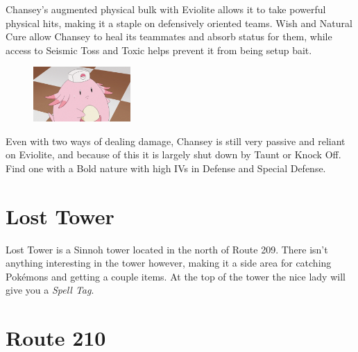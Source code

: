 \documentclass[11pt]{article}
\begin{document}


% 


\begin{mdframed}[style=MyFrame,nobreak=true,frametitle={Pokemon Spotlight: Chansey}]

Chansey's augmented physical bulk with Eviolite allows it to take powerful physical hits,
making it a staple on defensively oriented teams.
Wish and Natural Cure allow Chansey to heal its teammates and absorb status for them,
while access to Seismic Toss and Toxic helps prevent it from being setup bait.

\begin{figure}
\includegraphics[width=0.33\textwidth]{walkthrough/Sinnoh/spotlight-chansey}
\label{fig:spotlight-chansey}
\end{figure}

Even with two ways of dealing damage, Chansey is still very passive and reliant on
Eviolite, and because of this it is largely shut down by Taunt or Knock Off.
Find one with a Bold nature with high IVs in Defense and Special Defense.

\end{mdframed}

\section{Lost Tower}\label{sec:Lost_Tower}

Lost Tower is a Sinnoh tower located in the north of Route 209.
There isn’t anything interesting in the tower however,
making it a side area for catching Pokémons and getting a couple items.
At the top of the tower the nice lady will give you a \emph{Spell Tag}.







\section{Route 210}\label{sec:Route_210}
\end{document}
